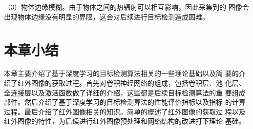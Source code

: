 （3）物体边缘模糊。由于物体之间的热辐射可以相互影响，因此采集到的
图像会出现物体边缘没有明显的界限，这会对后续进行目标检测造成困难。

\section{本章小结}
本章主要介绍了基于深度学习的目标检测算法相关的一些理论基础以及简
要的介绍了红外图像的获取过程。首先对卷积神经网络的组成，包括卷积层、池
化层、全连接层以及激活函数做了详细的介绍，这些都是后续目标检测算法的重
要组成部件。然后介绍了基于深度学习的目标检测算法的性能评价指标以及指标
的计算过程。最后介绍了红外图像相关的知识。简单的概述了红外图像的获取过
程以及红外图像的特性，为后续进行红外图像预处理和网络结构的改进打下理论
基础。
